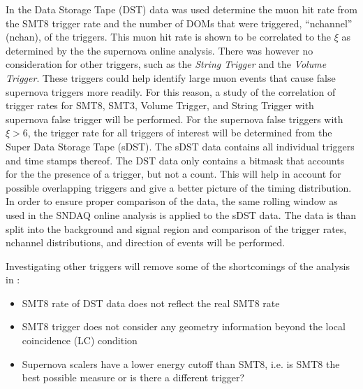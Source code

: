 
In \cite{vbaumaster} the Data Storage Tape (DST) data was used determine the muon hit rate from the SMT8 trigger rate and the number of DOMs that were triggered, ``nchannel'' (nchan), of the triggers. This muon hit rate is shown to be correlated to the $\xi$ as determined by the the supernova online analysis. There was however no consideration for other triggers, such as the \emph{String Trigger} and the \emph{Volume Trigger}. These triggers could help identify large muon events that cause false supernova triggers more readily. For this reason, a study of the correlation of trigger rates for SMT8, SMT3, Volume Trigger, and String Trigger with supernova false trigger will be performed. For the supernova false triggers with $\xi > 6$, the trigger rate for all triggers of interest will be determined from the Super Data Storage Tape (sDST). The sDST data contains all individual triggers and time stamps thereof. The DST data only contains a bitmask that accounts for the the presence of a trigger, but not a count. This will help in account for possible overlapping triggers and give a better picture of the timing distribution. In order to ensure proper comparison of the data, the same rolling window as used in the SNDAQ online analysis is applied to the sDST data. The data is than split into the background and signal region and comparison of the trigger rates, nchannel distributions, and direction of events will be performed.

Investigating other triggers will remove some of the shortcomings of the analysis in \cite{vbaumaster}:

\begin{itemize}
  \item SMT8 rate of DST data does not reflect the real SMT8 rate
  \item SMT8 trigger does not consider any geometry information beyond the local coincidence (LC) condition
  \item Supernova scalers have a lower energy cutoff than SMT8, i.e. is SMT8 the best possible measure or is there a different trigger?
\end{itemize}

